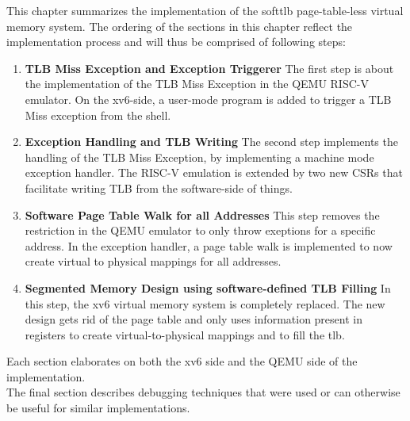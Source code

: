 This chapter summarizes the implementation of the softtlb page-table-less virtual memory system.
The ordering of the sections in this chapter reflect the implementation process and will thus
be comprised of following steps:
\begin{enumerate}
    \item \textbf{TLB Miss Exception and Exception Triggerer} The first step is about
          the implementation of the TLB Miss Exception in the QEMU RISC-V emulator. On the xv6-side,
          a user-mode program is added to trigger a TLB Miss exception from the shell.
    \item \textbf{Exception Handling and TLB Writing} The second step implements the
          handling of the TLB Miss Exception, by implementing a machine mode exception handler.
          The RISC-V emulation is extended by two new CSRs that facilitate writing TLB from the
          software-side of things.
    \item \textbf{Software Page Table Walk for all Addresses} This step removes the restriction
          in the QEMU emulator to only throw exeptions for a specific address. In the exception handler,
          a page table walk is implemented to now create virtual to physical mappings for all addresses.
    \item \textbf{Segmented Memory Design using software-defined TLB Filling} In this step, the xv6 virtual memory system is completely
          replaced. The new design gets rid of the page table and only uses information present in
          registers to create virtual-to-physical mappings and to fill the tlb.\\
\end{enumerate}
Each section elaborates on both the xv6 side and the QEMU side of the implementation.\\
The final section describes debugging techniques that were used or can otherwise be useful for
similar implementations.



